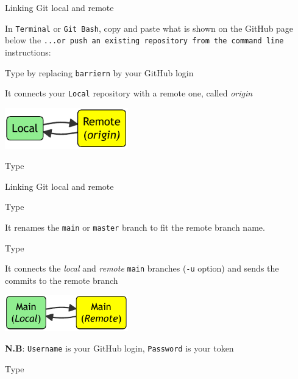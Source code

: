 \documentclass[10pt]{beamer}
\begin{document}
\begin{frame}[fragile]{Linking Git local and remote}
\protect\hypertarget{synchronization-to-the-remote}{}

In \texttt{Terminal} or \texttt{Git\ Bash}, copy and paste what is
shown on the GitHub page below the
\texttt{...or\ push\ an\ existing\ repository\ from\ the\ command\ line} instructions:

Type  by replacing \verb+barriern+ by your GitHub login

It connects your \verb+Local+ repository with a remote one, called
\emph{origin}

\begin{center}
 \includegraphics[width=0.4\textwidth]{mermaid/diagram-1-1.pdf}
\end{center}

Type 

\end{frame}

\begin{frame}[fragile]{Linking Git local and remote}

Type 

It renames the \verb+main+ or \verb+master+ branch to fit the remote branch name.

Type 

It connects the \emph{local} and \emph{remote} \verb+main+ branches (\verb+-u+ option) and sends the commits to the remote branch

\begin{center}
 \includegraphics[width=0.4\textwidth]{mermaid/diagram-2-1.pdf}
\end{center}

\textbf{N.B}: \texttt{Username} is your GitHub login, \texttt{Password} is your token

Type 

\end{frame}
\end{document}
